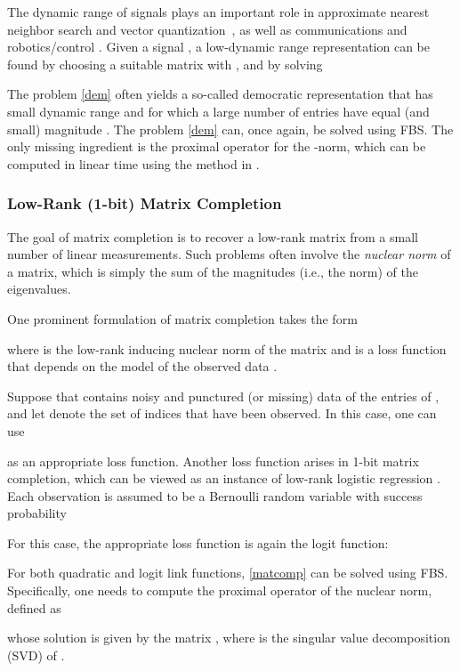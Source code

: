 \documentclass{amsart}
\newcommand{\half}{\frac{1}{2}}
\newcommand{\eqn}[2]{}
\DeclareMathOperator*{\minimize}{minimize\quad}
\theoremstyle{definition}
\begin{document}
The dynamic range of signals plays an important role in approximate nearest neighbor search and vector quantization~\cite{JFF11}, as well as communications and robotics/control \cite{SGB14}.
Given a signal , a low-dynamic range representation can be found by choosing a suitable matrix  with , and by solving 
   \eqn{dem}{
     \minimize \mu \|x\|_\infty +  \half \| Ax-b \|^2.
   }
The problem \eqref{dem} often yields a so-called democratic representation  that has small dynamic range and  for which a large number of entries have equal (and small) magnitude \cite{SGB14}. The problem \eqref{dem} can, once again,  be solved using FBS.  The only missing ingredient is the proximal operator for the -norm, which can be computed in linear time using the method in \cite{DSSC08}.


\subsubsection{Low-Rank (1-bit) Matrix Completion}

The goal of matrix completion is to recover a low-rank matrix  from a small number of linear measurements.  Such problems often involve the {\em nuclear norm} of a matrix, which is simply the sum of the magnitudes (i.e., the  norm) of the eigenvalues.

  One prominent formulation of matrix completion takes the form
\eqn{matcomp}{\minimize \mu \| X \|_* + L(X,Y), }
where  is the low-rank inducing nuclear norm of the matrix  and  is a loss function that depends on the model of the observed data  \cite{KMS09}.  
 
Suppose that  contains noisy and punctured (or missing) data of the entries of , and let  denote the set of indices that have been observed. In this case,  one can use 
  
as an appropriate loss function.
Another loss function arises in 1-bit matrix completion, which can be viewed as an instance of low-rank logistic regression  \cite{DPVW13}. Each observation  is assumed to be a Bernoulli random variable with success probability 
 
For this case, the appropriate loss function is again the logit function:   
 
For both quadratic and logit link functions, \eqref{matcomp} can be solved using FBS. Specifically, one needs to compute the proximal operator of the nuclear norm, defined as

whose solution is given by the matrix , where   is the singular value decomposition (SVD) of  \cite{DPVW13}.
\end{document}
